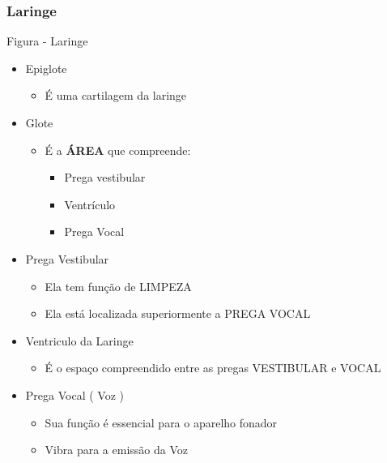\documentclass[
]{book}
\providecommand{\tightlist}{%
  \setlength{\itemsep}{0pt}\setlength{\parskip}{0pt}}
\begin{document}
\hypertarget{laringe}{%
\subsubsection{Laringe}\label{laringe}}

Figura - Laringe

\begin{itemize}
\tightlist
\item
  Epiglote

  \begin{itemize}
  \tightlist
  \item
    É uma cartilagem da laringe
  \end{itemize}
\item
  Glote

  \begin{itemize}
  \tightlist
  \item
    É a \textbf{ÁREA} que compreende:

    \begin{itemize}
    \tightlist
    \item
      Prega vestibular
    \item
      Ventrículo
    \item
      Prega Vocal
    \end{itemize}
  \end{itemize}
\item
  Prega Vestibular

  \begin{itemize}
  \tightlist
  \item
    Ela tem função de LIMPEZA
  \item
    Ela está localizada superiormente a PREGA VOCAL
  \end{itemize}
\item
  Ventriculo da Laringe

  \begin{itemize}
  \tightlist
  \item
    É o espaço compreendido entre as pregas VESTIBULAR e VOCAL
  \end{itemize}
\item
  Prega Vocal ( Voz )

  \begin{itemize}
  \tightlist
  \item
    Sua função é essencial para o aparelho fonador
  \item
    Vibra para a emissão da Voz
  \end{itemize}
\end{itemize}
\end{document}
